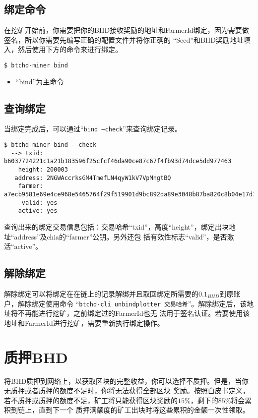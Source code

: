 \begin{flushleft}
\subsection{绑定命令}
\begin{flushleft}
    在挖矿开始前，你需要把你的BHD接收奖励的地址和FarmerId绑定，因为需要做签名，所以你需要先编写正确的配置文件并将你正确的
    ``Seed''和BHD奖励地址填入，然后使用下方的命令来进行绑定。
\end{flushleft}
\scriptsize
\begin{verbatim}
$ btchd-miner bind
\end{verbatim}
\normalsize
\begin{itemize}
    \item ``bind''为主命令
\end{itemize}
\subsection{查询绑定}
\begin{flushleft}
    当绑定完成后，可以通过``\texttt{bind --check}''来查询绑定记录。
\end{flushleft}
\scriptsize
\begin{verbatim}
$ btchd-miner bind --check
  --> txid: b6037724221c1a21b183596f25cfcf46da90ce87c67f4fb93d74dce5dd977463
    height: 200003
   address: 2NGWAccrksGM4TmefLN4qyW1kV7VpMngtBQ
    farmer: a7ecb9581e69e4ce968e5465764f29f519901d9bc892da89e3048b87ba820c8b04e17d726bfbb236e3f0e33f8a83851e
     valid: yes
    active: yes
\end{verbatim}
\normalsize
\begin{flushleft}
    查询出来的绑定交易信息包括：交易哈希``txid''，高度``height''，绑定出块地址``address''及chia的``farmer''公钥。另外还包
    括有效性标志``valid''，是否激活``active''。
\end{flushleft}
\subsection{解除绑定}
\begin{flushleft}
    解除绑定可以将绑定在在链上的记录解绑并且取回绑定所需要的$0.1_{BHD}$到原账户，解除绑定使用命令
    ``\texttt{btchd-cli unbindplotter 交易哈希}''。解除绑定后，该地址将不再能进行挖矿，之前绑定过的FarmerId也无
    法用于签名认证。若要使用该地址和FarmerId进行挖矿，需要重新执行绑定操作。
\end{flushleft}
\section{质押BHD}
\begin{flushleft}
    将BHD质押到网络上，以获取区块的完整收益，你可以选择不质押。但是，当你无质押或者质押的额度不足时，你将无法获得全部区块
    奖励。按照白皮书定义，若不质押或质押的额度不足，矿工将只能获得区块奖励的$15\%$，剩下的$85\%$将会累积到链上，直到下一个
    质押满额度的矿工出块时将这些累积的金额一次性领取。
\end{flushleft}

\end{flushleft}
